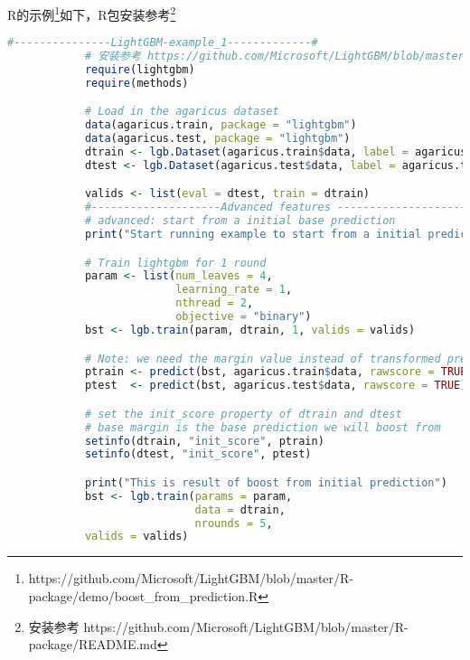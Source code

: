             R的示例\footnote{https://github.com/Microsoft/LightGBM/blob/master/R-package/demo/boost\_from\_prediction.R}如下，R包安装参考\footnote{安装参考 https://github.com/Microsoft/LightGBM/blob/master/R-package/README.md}
            \begin{lstlisting}[language = R]
            #---------------LightGBM-example_1-------------#
            # 安装参考 https://github.com/Microsoft/LightGBM/blob/master/R-package/README.md
            require(lightgbm)
            require(methods)

            # Load in the agaricus dataset
            data(agaricus.train, package = "lightgbm")
            data(agaricus.test, package = "lightgbm")
            dtrain <- lgb.Dataset(agaricus.train$data, label = agaricus.train$label)
            dtest <- lgb.Dataset(agaricus.test$data, label = agaricus.test$label)

            valids <- list(eval = dtest, train = dtrain)
            #--------------------Advanced features ---------------------------
            # advanced: start from a initial base prediction
            print("Start running example to start from a initial prediction")

            # Train lightgbm for 1 round
            param <- list(num_leaves = 4,
                          learning_rate = 1,
                          nthread = 2,
                          objective = "binary")
            bst <- lgb.train(param, dtrain, 1, valids = valids)

            # Note: we need the margin value instead of transformed prediction in set_init_score
            ptrain <- predict(bst, agaricus.train$data, rawscore = TRUE)
            ptest  <- predict(bst, agaricus.test$data, rawscore = TRUE)

            # set the init_score property of dtrain and dtest
            # base margin is the base prediction we will boost from
            setinfo(dtrain, "init_score", ptrain)
            setinfo(dtest, "init_score", ptest)

            print("This is result of boost from initial prediction")
            bst <- lgb.train(params = param,
                             data = dtrain,
                             nrounds = 5,
            valids = valids)
            \end{lstlisting}

